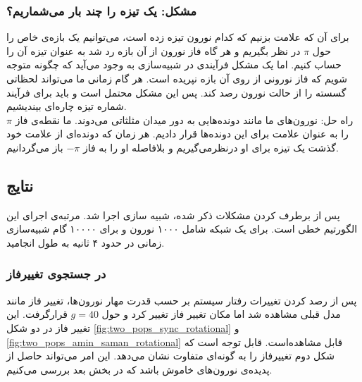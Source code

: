 \documentclass[12pt,onecolumn,a4paper]{article}
\begin{document}
\subsubsection{مشکل: یک تیزه را چند بار می‌شماریم؟}
برای آن که علامت بزنیم که کدام نورون تیزه زده است، می‌توانیم یک بازه‌ی خاص را حول $\pi$ در نظر بگیریم و هر گاه فاز نورون از آن بازه رد شد به عنوان تیزه آن را حساب کنیم. اما یک مشکل فرآیندی در شبیه‌سازی به وجود می‌آید که چگونه متوجه شویم که فاز نورونی از روی آن بازه نپریده است. هر گام زمانی ما می‌تواند لحظاتی گسسته را از حالت نورون رصد کند. پس این مشکل محتمل است و باید برای فرآیند شماره تیزه چاره‌ای بیندیشیم.\\

راه حل: نورون‌های ما مانند دونده‌هایی به دور میدان مثلثاتی می‌دوند. ما نقطه‌ی فاز $\pi$ را به عنوان علامت برای این دونده‌ها قرار دادیم. هر زمان که دونده‌ای از علامت خود گذشت یک تیزه برای او درنظرمی‌گیریم و بلافاصله او را به فاز $-\pi$ باز می‌گردانیم.


\subsection{نتایج }
پس از برطرف کردن مشکلات ذکر شده، شبیه سازی اجرا شد. مرتبه‌ی اجرای این الگورتیم خطی است. برای یک شبکه شامل ۱۰۰۰ نورون و برای ۱۰۰۰۰ گام شبیه‌سازی زمانی در حدود ۴ ثانیه به طول انجامید. 


\subsubsection{در جستجوی تغییرفاز}
پس از رصد کردن تغییرات رفتار سیستم بر حسب قدرت مهار نورون‌ها، تغییر فاز مانند مدل قبلی مشاهده شد اما مکان تغییر فاز تغییر کرد و حول $g=40$ قرارگرفت. این تغییر فاز در دو شکل \ref{fig:two_pops_sync_rotational} و \ref{fig:two_pops_amin_saman_rotational}  قابل مشاهده‌است. قابل توجه است که شکل دوم تغییرفاز را به گونه‌ای متفاوت نشان می‌دهد. این امر می‌تواند حاصل از پدیده‌ی نورون‌های خاموش باشد که در بخش بعد بررسی می‌کنیم.

\end{document}
